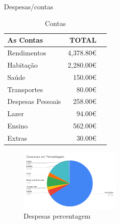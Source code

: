 \documentclass[11pt]{beamer}
\begin{document}
	\begin{frame}{Despesas/contas}

		\begin{multicols}{2}			
			\begin{table}[!h]\centering
				\scriptsize
				\begin{tabular}{lrr}\toprule
					As Contas &TOTAL \\\midrule
					Rendimentos & 4,378.80€ \\
					Habitação & 2,280.00€ \\
					Saúde & 150.00€ \\
					Transportes & 80.00€ \\
					Despesas Pessoais & 258.00€ \\
					Lazer & 94.00€ \\
					Ensino & 562.00€ \\
					Extras & 30.00€ \\
					\bottomrule
				\end{tabular}
				\caption{Contas}\label{tab:contas}
			\end{table}
	
			\begin{figure}
				\includegraphics[width=5cm]{./despesas_percentagem.png}
				\caption{Despesas percentagem}\label{fig:circular}
			\end{figure}
		\end{multicols}
	\end{frame}
\end{document}
